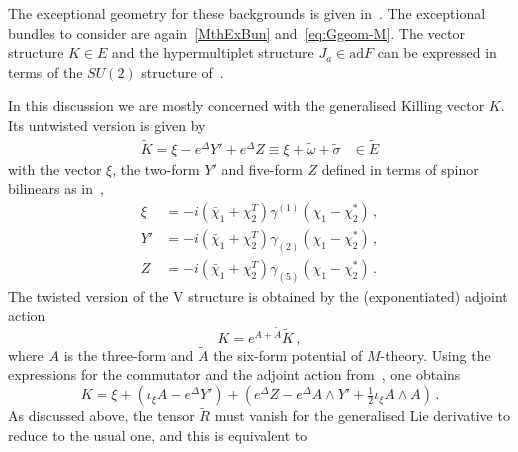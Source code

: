 \documentclass[debug]{phd}
\begin{document}
The exceptional geometry for these backgrounds is given in~\cite{AshmoreESE,Grana_Ntokos}.
The exceptional bundles to consider are again~\eqref{MthExBun} and~\eqref{eq:Ggeom-M}. 
The vector structure $K\in E$ and the hypermultiplet structure $J_a \in \mathrm{ad}F$ can be expressed in terms of the $SU(2)$ structure of~\cite{Gauntlett:2004zh}. 

In this discussion we are mostly concerned with the generalised Killing vector $K$. 
Its untwisted version is given by
%
	\begin{equation}
	\label{vecK}
		\begin{array}{cc}
			\tilde{K}=\xi -e^{\Delta} Y' + e^{\Delta} Z \equiv \xi + \tilde{\omega} + \tilde{\sigma} & \in \tilde{E} 
		\end{array}
	\end{equation}
%
with the vector $\xi$, the two-form $Y'$ and five-form $Z$ defined in terms of spinor bilinears as in~\cite{AshmoreESE}, 
%
	\begin{align}
		\label{vecbilM6}
		\xi &= -i \left(\bar{\chi}_1+\chi_2^T\right)\gamma^{(1)}\left(\chi_1 - \chi_2^* \right)\, ,\\[1mm]
		\label{YbilM6}
		Y' &= -i \left(\bar{\chi}_1+\chi_2^T\right)\gamma_{(2)}\left(\chi_1 - \chi_2^* \right)\, ,\\[1mm]
		\label{ZbilM6}
		Z &= -i \left(\bar{\chi}_1+\chi_2^T\right) \gamma_{(5)} \left(\chi_1 - \chi_2^* \right)\, .
	\end{align}
%
The twisted version of the V structure is obtained by the (exponentiated) adjoint action
%
\begin{equation}
	K = e^{A+\tilde{A}} \tilde{K}\, ,
\end{equation}
%
where $A$ is the three-form and $\tilde{A}$ the six-form potential of $M$-theory. Using the expressions for the commutator and the adjoint action from~\cite{AshmoreECY}, one obtains~\cite{AshmoreESE} 
%
	\begin{equation}
	\label{eq:twisted_K_M}
		K= \xi + \left( \iota_{\xi}A - e^{\Delta}Y'\right) + \left( e^{\Delta} Z - e^{\Delta} A \wedge Y' + \tfrac{1}{2} \iota_{\xi} A \wedge A\right)\, .
	\end{equation}
%
As discussed above, the tensor $\tilde{R}$ must vanish for the generalised Lie derivative to reduce to the usual one, and this is equivalent to~\cite{AshmoreESE}
\end{document}
